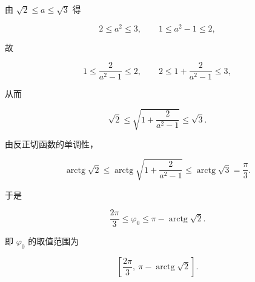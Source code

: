 \begin{answer}
由 $\sqrt2\le a\le\sqrt3$ 得

\nopagebreak[4]
\[
2\le a^2\le3,\qquad 1\le a^2-1\le2,
\]

故

\nopagebreak[4]
\[
1\le\frac{2}{a^2-1}\le2,
\qquad
2\le1+\frac{2}{a^2-1}\le3,
\]

从而

\nopagebreak[4]
\[
\sqrt2\le\sqrt{1+\frac{2}{a^2-1}}\le\sqrt3.
\]

由反正切函数的单调性，

\nopagebreak[4]
\[
\operatorname{arctg}\sqrt2
\le\operatorname{arctg}\sqrt{1+\frac{2}{a^2-1}}
\le\operatorname{arctg}\sqrt3=\frac{\pi}{3}.
\]

于是

\nopagebreak[4]
\[
\frac{2\pi}{3}\le\varphi_0\le\pi-\operatorname{arctg}\sqrt2.
\]

即 $\varphi_0$ 的取值范围为

\nopagebreak[4]
\[
\left[\frac{2\pi}{3},\ \pi-\operatorname{arctg}\sqrt2\right].
\]


\end{answer}